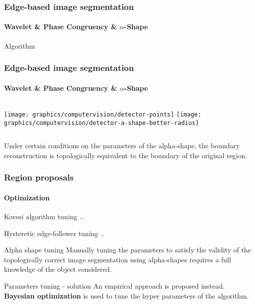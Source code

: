     \begin{frame}
        \frametitle{Edge-based image segmentation}
        \framesubtitle{Wavelet \& Phase Congruency \& $\alpha$-Shape}
            Algorithm
    \end{frame}

\begin{frame}
    \frametitle{Edge-based image segmentation}
    \framesubtitle{Wavelet \& Phase Congruency \& $\alpha$-Shape}
    \begin{columns}[onlytextwidth]
             {
                \texttt{[image: graphics/computervision/detector-points]}
            }
             {
                \texttt{[image: graphics/computervision/detector-a-shape-better-radius]}
            }
    \end{columns}
     {
        \begin{theorem}
            Under certain conditions on the parameters of the alpha-shape, the boundary reconstruction is topologically equivalent to the boundary of the original region.
        \end{theorem}
    }
\end{frame}

\begin{frame}
    \frametitle{Region proposals}
    \framesubtitle{Optimization}
     {
        \begin{alertblock}{Kovesi algorithm tuning}
            ..
        \end{alertblock}
    }
     {
        \begin{alertblock}{Hysteretic edge-follower tuning}
            ..
        \end{alertblock}
    }
     {
        \begin{alertblock}{Alpha shape tuning}
            Manually tuning the parameters to satisfy the validity of the topologically correct image segmentation using alpha-shapes requires a full knowledge of the object considered.
        \end{alertblock}
    }
     {
        \begin{exampleblock}{Parameters tuning - solution}
            An empirical approach is proposed instead. \textbf{Bayesian optimization} is used to tune the hyper parameters of the algorithm.
        \end{exampleblock}
    }
\end{frame}

